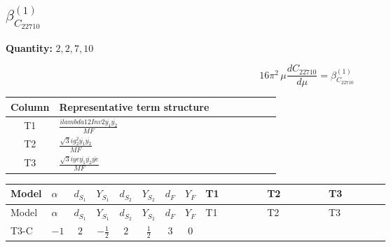 \documentclass[8pt]{article}
\begin{document}
\begin{landscape}
\section*{$\beta_{C_{22710}}^{(1)}$}
\noindent\textbf{Quantity: }$\mathrm{2,2,7,10}$\par\smallskip
\[16\pi^2\,\mu\frac{d C_{22710}}{d\mu}=\beta_{C_{22710}}^{(1)}\]
\begin{center}
\begin{tabular}{@{}c >{\raggedright\arraybackslash}p{0.82\linewidth}@{}}
\toprule
Column & Representative term structure \\
\midrule
T1 & \(\displaystyle \frac{i lambda12Inv2 \overline{y_{1}} \overline{y_{2}}}{MF}\) \\
\midrule
T2 & \(\displaystyle \frac{\sqrt{3} i g_{2}^{2} \overline{y_{1}} \overline{y_{2}}}{MF}\) \\
\midrule
T3 & \(\displaystyle \frac{\sqrt{3} i ye \overline{y_{1}} \overline{y_{2}} \overline{ye}}{MF}\) \\
\midrule
\bottomrule
\end{tabular}
\end{center}
\smallskip
\tiny
\begin{longtable}{@{}llcccccc >{\raggedright\arraybackslash}p{0.21\linewidth} >{\raggedright\arraybackslash}p{0.21\linewidth} >{\raggedright\arraybackslash}p{0.21\linewidth}@{}}
\toprule
Model & $\alpha$ & $d_{S_1}$ & $Y_{S_1}$ & $d_{S_2}$ & $Y_{S_2}$ & $d_F$ & $Y_F$ & T1 & T2 & T3 \\
\midrule
\endfirsthead
\toprule
Model & $\alpha$ & $d_{S_1}$ & $Y_{S_1}$ & $d_{S_2}$ & $Y_{S_2}$ & $d_F$ & $Y_F$ & T1 & T2 & T3 \\
\midrule
\endhead
T3-C & $-1$ & $2$ & $-\frac{1}{2}$ & $2$ & $\frac{1}{2}$ & $3$ & $0$ & \scriptsize\adjustbox{max width=\linewidth}{$\begin{gathered} - \frac{i lambda12Inv2 \overline{y_{1}} \overline{y_{2}}}{3 MF}\end{gathered}$} & \scriptsize\adjustbox{max width=\linewidth}{$\begin{gathered} - \frac{\sqrt{3} i g_{2}^{2} \overline{y_{1}} \overline{y_{2}}}{4 MF}\end{gathered}$} & \scriptsize\adjustbox{max width=\linewidth}{$\begin{gathered} \frac{\sqrt{3} i ye \overline{y_{1}} \overline{y_{2}} \overline{ye}}{12 MF}\end{gathered}$} \\
\midrule
\bottomrule
\end{longtable}
\clearpage

\end{landscape}
\end{document}
